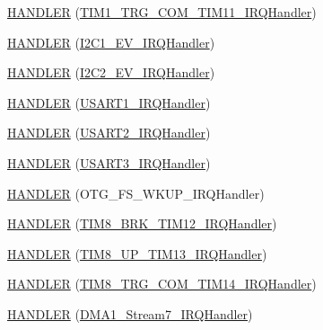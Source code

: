 \begin{DoxyCompactItemize}
\item 
\hyperlink{group___p_i_o_s_gacc5fee09d8594fbce1941ddb36631718}{H\-A\-N\-D\-L\-E\-R} (\hyperlink{group___p_i_o_s___t_i_m_ga098245bf4e2f8844b22692b034a266fb}{T\-I\-M1\-\_\-\-T\-R\-G\-\_\-\-C\-O\-M\-\_\-\-T\-I\-M11\-\_\-\-I\-R\-Q\-Handler})
\item 
\hyperlink{group___p_i_o_s_ga1783b0468c1bdb51696e3fa7484d15d9}{H\-A\-N\-D\-L\-E\-R} (\hyperlink{group___tau_labs_core_gad0e17b57fe51ed2861178f06899345c0}{I2\-C1\-\_\-\-E\-V\-\_\-\-I\-R\-Q\-Handler})
\item 
\hyperlink{group___p_i_o_s_ga03be10db0a301a884516b2bec72fd339}{H\-A\-N\-D\-L\-E\-R} (\hyperlink{group___open_pilot_core_gaa32a80208798d6132876a58823ff6202}{I2\-C2\-\_\-\-E\-V\-\_\-\-I\-R\-Q\-Handler})
\item 
\hyperlink{group___p_i_o_s_ga9c27c83d8c59cb384efcca34a7aaf531}{H\-A\-N\-D\-L\-E\-R} (\hyperlink{group___p_i_o_s___u_s_a_r_t_ga7139cd4baabbbcbab0c1fe6d7d4ae1cc}{U\-S\-A\-R\-T1\-\_\-\-I\-R\-Q\-Handler})
\item 
\hyperlink{group___p_i_o_s_gacd95f312186dc47a3c131c7df33a0384}{H\-A\-N\-D\-L\-E\-R} (\hyperlink{group___p_i_o_s___u_s_a_r_t_ga0ca6fd0e6f77921dd1123539857ba0a8}{U\-S\-A\-R\-T2\-\_\-\-I\-R\-Q\-Handler})
\item 
\hyperlink{group___p_i_o_s_ga5daada32634b528ac183ba5ca2a50d34}{H\-A\-N\-D\-L\-E\-R} (\hyperlink{group___p_i_o_s___u_s_a_r_t_ga0d108a3468b2051548183ee5ca2158a0}{U\-S\-A\-R\-T3\-\_\-\-I\-R\-Q\-Handler})
\item 
\hyperlink{group___p_i_o_s_ga93013dd7cf810d7c7985096942b4f7f4}{H\-A\-N\-D\-L\-E\-R} (O\-T\-G\-\_\-\-F\-S\-\_\-\-W\-K\-U\-P\-\_\-\-I\-R\-Q\-Handler)
\item 
\hyperlink{group___p_i_o_s_gaf58ab9a64ef5177e43b0f0ae8157a3b9}{H\-A\-N\-D\-L\-E\-R} (\hyperlink{group___p_i_o_s___t_i_m_ga301e0d3520f05f672ce047976f75ff6a}{T\-I\-M8\-\_\-\-B\-R\-K\-\_\-\-T\-I\-M12\-\_\-\-I\-R\-Q\-Handler})
\item 
\hyperlink{group___p_i_o_s_gac098e20bbfe6d5c8b1538edd9dc3cf0b}{H\-A\-N\-D\-L\-E\-R} (\hyperlink{group___p_i_o_s___t_i_m_ga7fb516f8826d882ac91cfc093884fcf5}{T\-I\-M8\-\_\-\-U\-P\-\_\-\-T\-I\-M13\-\_\-\-I\-R\-Q\-Handler})
\item 
\hyperlink{group___p_i_o_s_ga59b4c726aea5cc82c6aaf1d1328d7845}{H\-A\-N\-D\-L\-E\-R} (\hyperlink{group___p_i_o_s___t_i_m_ga4c8359a023f7ede4a9d9f94ea6fb92da}{T\-I\-M8\-\_\-\-T\-R\-G\-\_\-\-C\-O\-M\-\_\-\-T\-I\-M14\-\_\-\-I\-R\-Q\-Handler})
\item 
\hyperlink{group___p_i_o_s_ga6493d239229d24bde302872ba743c42e}{H\-A\-N\-D\-L\-E\-R} (\hyperlink{group___tau_labs_core_gae81787590524971351490705554cc351}{D\-M\-A1\-\_\-\-Stream7\-\_\-\-I\-R\-Q\-Handler})

\end{DoxyCompactItemize}
